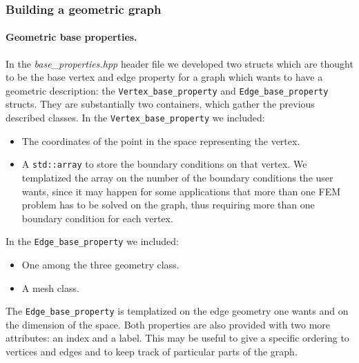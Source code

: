 \documentclass[10pt]{article} %
\newcommand{\classname}[1]{\texttt{#1}}
\begin{document}
	\subsubsection{Building a geometric graph}		
	\paragraph{Geometric base properties.} In the \textit{base\_properties.hpp} header file we developed two structs which are thought to be the base vertex and edge property for a graph which wants to have a geometric description: the \classname{Vertex\_base\_property} and \classname{Edge\_base\_property} structs. They are substantially two containers, which gather the previous described classes.
	In the \classname{Vertex\_base\_property} we included:
	\begin{itemize}
		\item The coordinates of the point in the space representing the vertex.
		\item A \texttt{std::array} to store the boundary conditions on that vertex. We templatized the array on the number of the boundary conditions the user wants, since it may happen for some applications that more than one FEM problem has to be solved on the graph, thus requiring more than one boundary condition for each vertex.
	\end{itemize}
	In the \classname{Edge\_base\_property} we included:
	\begin{itemize}
		\item One among the three geometry class.
		\item A mesh class.
	\end{itemize}
	The \classname{Edge\_base\_property} is templatized on the edge geometry one wants and on the dimension of the space. \newline
	Both properties are also provided with two more attributes: an index and a label. This may be useful to give a specific ordering to vertices and edges and to keep track of particular parts of the graph.
\end{document}
